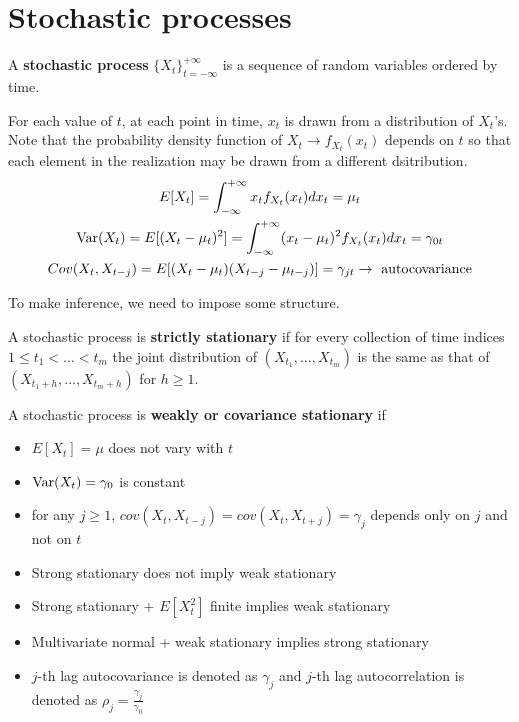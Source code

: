 \ChapterHeading

\section{Stochastic processes}

\begin{definition}
    A \textbf{stochastic process} $\{X_t\}^{+\infty}_{t=-\infty}$ is a sequence of random variables ordered by time.
\end{definition}
For each value of $t$, at each point in time, $x_t$ is drawn from a distribution of $X_t$'s.
Note that the probability density function of $X_t\to f_{X_t}(x_t)$ depends on $t$ so that each element in the realization may be drawn from a different dsitribution.
\begin{gather*}
    E[X_t] = \int_{-\infty}^{+\infty} x_t f_{X_t}(x_t)dx_t = \mu_t\\
    \operatorname{Var}(X_t) = E[(X_t-\mu_t)^2] = \int_{-\infty}^{+\infty} (x_t - \mu_t)^2 f_{X_t}(x_t)dx_t = \gamma_{0t}\\
    Cov(X_t, X_{t-j}) = E[(X_t-\mu_t)(X_{t-j}-\mu_{t-j})] = \gamma_{jt} \to \text{ autocovariance}
\end{gather*}

To make inference, we need to impose some structure.

\begin{definition}
    A stochastic process is \textbf{strictly stationary} if for every collection of time indices $1\leq t_1<\ldots<t_m$ the joint distribution of $(X_{t_1},\ldots,X_{t_m})$ is the same as that of $(X_{t_1+h},\ldots,X_{t_m+h})$ for $h\geq 1$.
\end{definition}
\begin{definition}
    A stochastic process is \textbf{weakly or covariance stationary} if
    \begin{itemize}
        \item $E[X_t] = \mu$ does not vary with $t$
        \item $\operatorname{Var}(X_t) = \gamma_0$ is constant
        \item for any $j\geq 1$, $cov(X_t,X_{t-j}) = cov(X_t,X_{t+j}) = \gamma_j$ depends only on $j$ and not on $t$
    \end{itemize}
\end{definition}
\begin{itemize}
    \item Strong stationary does not imply weak stationary
    \item Strong stationary + $E[X^2_t]$ finite implies weak stationary
    \item Multivariate normal + weak stationary implies strong stationary
    \item $j$-th lag autocovariance is denoted as $\gamma_j$ and $j$-th lag autocorrelation is denoted as $\rho_j = \frac{\gamma_j}{\gamma_0}$
\end{itemize}

